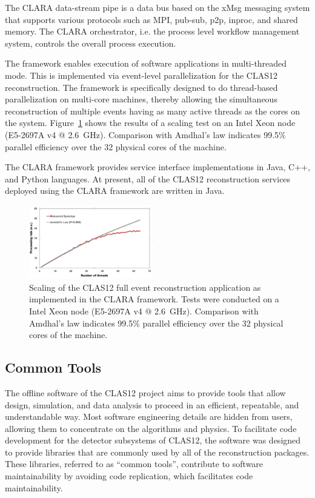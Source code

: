 The CLARA data-stream pipe is a data bus based on the xMsg messaging system that supports various protocols
such as MPI, pub-sub, p2p, inproc, and shared memory. The CLARA orchestrator, i.e. the process level workflow
management system, controls the overall process execution. 

The framework enables execution of software applications in multi-threaded mode. This is implemented via
event-level parallelization for the CLAS12 reconstruction. The framework is specifically designed to do
thread-based parallelization on multi-core machines, thereby allowing the simultaneous reconstruction of multiple
events having as many active threads as the cores on the system. Figure~\ref{fig:scaling} shows the results of a
scaling test on an Intel Xeon node (E5-2697A v4 @ 2.6~GHz). Comparison with Amdhal's law indicates 99.5\%
parallel efficiency over the 32 physical cores of the machine.

The CLARA framework provides service interface implementations in Java, C++, and Python languages. At present,
all of the CLAS12 reconstruction services deployed using the CLARA framework are written in Java.

\begin{figure}
\centering
\includegraphics[width=0.48\textwidth]{pics/scaling.png}
\caption{Scaling of the CLAS12 full event reconstruction application as implemented in the CLARA framework. Tests
  were conducted on a Intel Xeon node (E5-2697A v4 @ 2.6~GHz). Comparison with Amdhal's law indicates 99.5\%
  parallel efficiency over the 32 physical cores of the machine.}
\label{fig:scaling}
\end{figure}

\subsection{Common Tools}
\label{common-tools}

The offline software of the CLAS12 project aims to provide tools that allow design, simulation, and data analysis
to proceed in an efficient, repeatable, and understandable way. Most  software engineering details are hidden from
users, allowing them to concentrate on the algorithms and physics. To facilitate code development for the detector
subsystems of CLAS12, the software was designed to provide libraries that are commonly used by all of the
reconstruction packages.  These libraries, referred to as ``common tools'',  contribute to software maintainability 
by avoiding code replication, which facilitates code maintainability.

